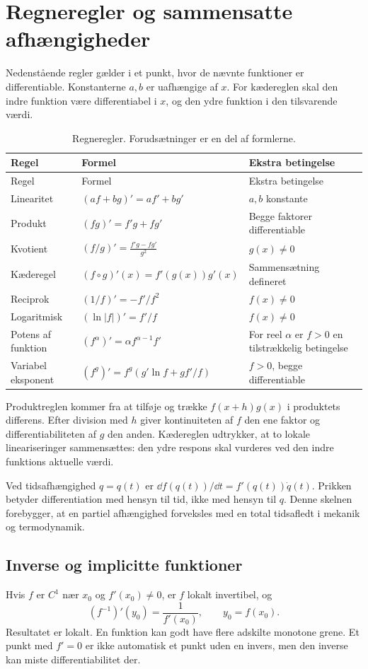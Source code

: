\section{Regneregler og sammensatte afhængigheder}
\label{sec:regler}
Nedenstående regler gælder i et punkt, hvor de nævnte funktioner er differentiable. Konstanterne $a,b$ er uafhængige af $x$. For kædereglen skal den indre funktion være differentiabel i $x$, og den ydre funktion i den tilsvarende værdi.

\begin{longtable}{@{}p{}p{}p{}@{}}
\caption{Regneregler. Forudsætninger er en del af formlerne.}\label{tab:regler}\\
\toprule Regel & Formel & Ekstra betingelse\\\midrule\endfirsthead
\toprule Regel & Formel & Ekstra betingelse\\\midrule\endhead
Linearitet & $(af+bg)'=af'+bg'$ & $a,b$ konstante\\[2mm]
Produkt & $(fg)'=f'g+fg'$ & Begge faktorer differentiable\\[2mm]
Kvotient & $\displaystyle (f/g)'=\frac{f'g-fg'}{g^2}$ & $g(x)\ne0$\\[3mm]
Kæderegel & $(f\circ g)'(x)=f'(g(x))g'(x)$ & Sammensætning defineret\\[2mm]
Reciprok & $(1/f)'=-f'/f^2$ & $f(x)\ne0$\\[2mm]
Logaritmisk & $(\ln|f|)'=f'/f$ & $f(x)\ne0$\\[2mm]
Potens af funktion & $(f^\alpha)'=\alpha f^{\alpha-1}f'$ & For reel $\alpha$ er $f>0$ en tilstrækkelig betingelse\\[2mm]
Variabel eksponent & $(f^g)'=f^g(g'\ln f+gf'/f)$ & $f>0$, begge differentiable\\
\bottomrule
\end{longtable}
Produktreglen kommer fra at tilføje og trække $f(x+h)g(x)$ i produktets differens. Efter division med $h$ giver kontinuiteten af $f$ den ene faktor og differentiabiliteten af $g$ den anden. Kædereglen udtrykker, at to lokale lineariseringer sammensættes: den ydre respons skal vurderes ved den indre funktions aktuelle værdi.

Ved tidsafhængighed $q=q(t)$ er $\dd f(q(t))/\dd t=f'(q(t))\dot q(t)$. Prikken betyder differentiation med hensyn til tid, ikke med hensyn til $q$. Denne skelnen forebygger, at en partiel afhængighed forveksles med en total tidsafledt i mekanik og termodynamik.

\subsection{Inverse og implicitte funktioner}
Hvis $f$ er $C^1$ nær $x_0$ og $f'(x_0)\ne0$, er $f$ lokalt invertibel, og
\[
 (f^{-1})'(y_0)=\frac{1}{f'(x_0)},\qquad y_0=f(x_0).
\]
Resultatet er lokalt. En funktion kan godt have flere adskilte monotone grene. Et punkt med $f'=0$ er ikke automatisk et punkt uden en invers, men den inverse kan miste differentiabilitet der.

